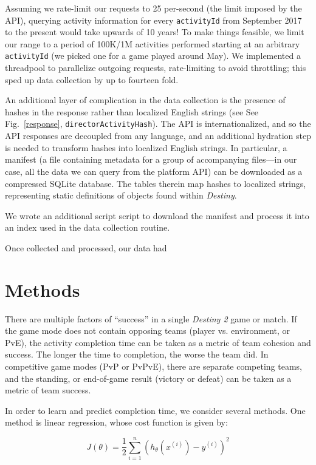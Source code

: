 \documentclass[conference]{IEEEtran}
\begin{document}
Assuming we rate-limit our requests to 25 per-second (the limit imposed by the
API), querying activity information for every \texttt{activityId} from
September 2017 to the present would take upwards of 10 years! To make things
feasible, we limit our range to a period of 100K/1M activities performed
starting at an arbitrary \texttt{activityId} (we picked one for a game played
around May). We implemented a threadpool to
parallelize outgoing requests, rate-limiting to avoid throttling; this sped up
data collection by up to fourteen fold.

An additional layer of complication in the data collection is the presence of
hashes in the response rather than localized English strings (see See
Fig.~\ref{response}, \texttt{directorActivityHash}). The API is
internationalized, and so the API responses are decoupled from any language,
and an additional hydration step is needed to transform hashes into localized
English strings. In particular, a manifest (a file containing metadata for a
group of accompanying files—in our case, all the data we can query from the
platform API) can be downloaded as a compressed SQLite database. The tables
therein map hashes to localized strings, representing static definitions of
objects found within \textit{Destiny}.

We wrote an additional script script to download the manifest and process it
into an index used in the data collection routine.

Once collected and processed, our data had

\section{Methods}\label{M}
There are multiple factors of ``success'' in a single \textit{Destiny 2}
game or match. If the game mode does not contain opposing teams (player vs.
environment, or PvE), the activity completion time can be taken as a metric of
team cohesion and success. The longer the time to completion, the worse the
team did. In competitive game modes (PvP or PvPvE), there are separate
competing teams, and the standing, or end-of-game result (victory or defeat)
can be taken as a metric of team success.

In order to learn and predict completion time, we consider several methods. One
method is linear regression, whose cost function is given by:

\begin{equation}
    J(\theta) = \frac{1}{2} \sum_{i = 1}^n
    (h_\theta (x^{(i)}) - y^{(i)})^2
\end{equation}
\end{document}
